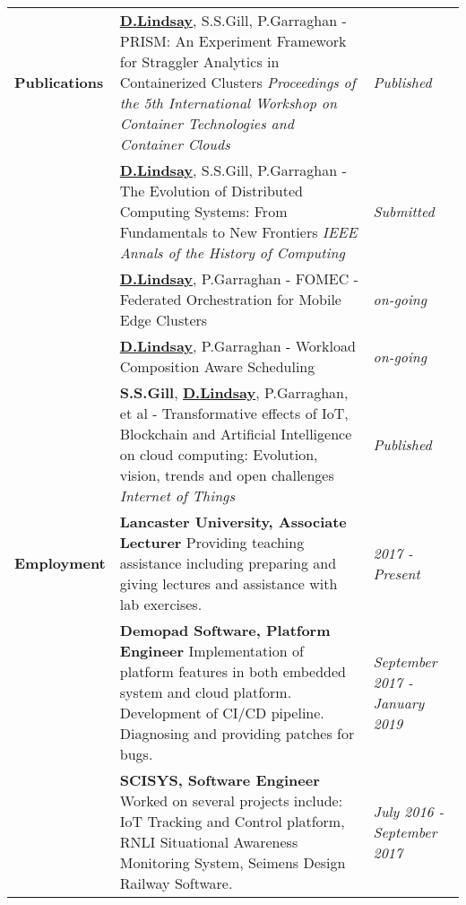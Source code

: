 \documentclass[11pt,a4,oneside]{article}
\begin{document}
\begin{minipage}[t][0pt]{\linewidth}
\begin{tabular}[t]{ L{2.5cm} |  L{12.5cm}  R{3.5cm}}
		
		\\  \textbf{Publications} &
		\textbf{\underline{D.Lindsay}}, S.S.Gill, P.Garraghan - PRISM: An Experiment Framework for Straggler Analytics in Containerized Clusters \newline \textit{Proceedings of the 5th International Workshop on Container Technologies and Container Clouds}  & \textit{Published}
		\\ & \textbf{\underline{D.Lindsay}}, S.S.Gill,  P.Garraghan - The Evolution of Distributed Computing Systems: From Fundamentals to New Frontiers \newline \textit{IEEE Annals of the History of Computing} & \textit{Submitted}
		\\ & \textbf{\underline{D.Lindsay}}, P.Garraghan - FOMEC - Federated Orchestration for Mobile Edge Clusters & \textit{on-going}
		\\ & \textbf{\underline{D.Lindsay}}, P.Garraghan - Workload Composition Aware Scheduling & \textit{on-going}
		\\ & \textbf{S.S.Gill}, \textbf{\underline{D.Lindsay}}, P.Garraghan, et al - Transformative effects of IoT, Blockchain and Artificial Intelligence on cloud computing: Evolution, vision, trends and open challenges \newline \textit{Internet of Things} & \textit{Published}
		
		
		
		\\ \textbf{Employment} &
		\textbf{Lancaster University, Associate Lecturer} \newline Providing teaching assistance including preparing and giving lectures and assistance with lab exercises. & \textit{2017 - Present} 
		\\ & \textbf{Demopad Software, Platform Engineer} \newline Implementation of platform features in both embedded system and cloud platform. Development of CI/CD pipeline. Diagnosing and providing patches for bugs. & \textit{September 2017 - January 2019}
		\\ & \textbf{SCISYS, Software Engineer} \newline Worked on several projects include: IoT Tracking and Control platform, RNLI Situational Awareness Monitoring System, Seimens Design Railway Software. & \textit{July 2016 - September 2017} 
			
		

\end{tabular}
\end{minipage}
\end{document}
